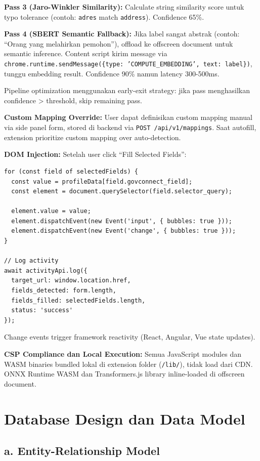\documentclass[12pt,a4paper]{article}
\begin{document}
\textbf{Pass 3 (Jaro-Winkler Similarity):} Calculate string similarity score untuk typo tolerance (contoh: \texttt{adres} match \texttt{address}). Confidence 65\%.

\textbf{Pass 4 (SBERT Semantic Fallback):} Jika label sangat abstrak (contoh: ``Orang yang melahirkan pemohon''), offload ke offscreen document untuk semantic inference. Content script kirim message via \texttt{chrome.runtime.sendMessage(\{type: 'COMPUTE\_EMBEDDING', text: label\})}, tunggu embedding result. Confidence 90\% namun latency 300-500ms.

Pipeline optimization menggunakan early-exit strategy: jika pass menghasilkan confidence \textgreater{} threshold, skip remaining pass.

\textbf{Custom Mapping Override:} User dapat definisikan custom mapping manual via side panel form, stored di backend via \texttt{POST /api/v1/mappings}. Saat autofill, extension prioritize custom mapping over auto-detection.

\textbf{DOM Injection:} Setelah user click ``Fill Selected Fields'':

\begin{lstlisting}
for (const field of selectedFields) {
  const value = profileData[field.govconnect_field];
  const element = document.querySelector(field.selector_query);
  
  element.value = value;
  element.dispatchEvent(new Event('input', { bubbles: true }));
  element.dispatchEvent(new Event('change', { bubbles: true }));
}

// Log activity
await activityApi.log({
  target_url: window.location.href,
  fields_detected: form.length,
  fields_filled: selectedFields.length,
  status: 'success'
});
\end{lstlisting}

Change events trigger framework reactivity (React, Angular, Vue state updates).

\textbf{CSP Compliance dan Local Execution:} Semua JavaScript modules dan WASM binaries bundled lokal di extension folder (\texttt{/lib/}), tidak load dari CDN. ONNX Runtime WASM dan Transformers.js library inline-loaded di offscreen document.

\newpage

\section{Database Design dan Data Model}

\subsection*{a. Entity-Relationship Model}
\end{document}
